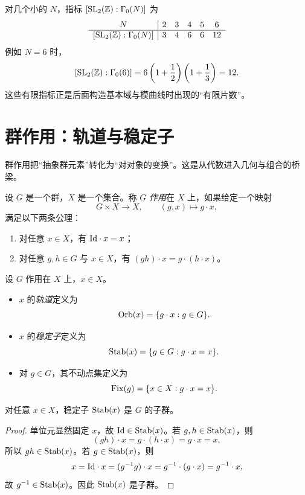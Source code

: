 \begin{example}
对几个小的 $N$，指标 $[\mathrm{SL}_2(\mathbb{Z}):\Gamma_0(N)]$ 为
\[
\begin{array}{c|ccccc}
N & 2 & 3 & 4 & 5 & 6 \\\hline
[\mathrm{SL}_2(\mathbb{Z}):\Gamma_0(N)] & 3 & 4 & 6 & 6 & 12
\end{array}
\]
例如 $N=6$ 时，
\[
[\mathrm{SL}_2(\mathbb{Z}):\Gamma_0(6)]
=6\left(1+\frac12\right)\left(1+\frac13\right)=12.
\]
这些有限指标正是后面构造基本域与模曲线时出现的“有限片数”。
\end{example}

\section{群作用：轨道与稳定子}

群作用把“抽象群元素”转化为“对对象的变换”。这是从代数进入几何与组合的桥梁。

\begin{definition}
设 $G$ 是一个群，$X$ 是一个集合。称 $G$ \emph{作用}在 $X$ 上，如果给定一个映射
\[
G\times X\longrightarrow X,
\qquad (g,x)\longmapsto g\cdot x,
\]
满足以下两条公理：
\begin{enumerate}
  \item 对任意 $x\in X$，有 $\mathrm{Id}\cdot x=x$；
  \item 对任意 $g,h\in G$ 与 $x\in X$，有 $(gh)\cdot x=g\cdot(h\cdot x)$。
\end{enumerate}
\end{definition}

\begin{definition}
设 $G$ 作用在 $X$ 上，$x\in X$。
\begin{itemize}
  \item $x$ 的\emph{轨道}定义为
  \[
  \operatorname{Orb}(x)=\{g\cdot x:g\in G\}.
  \]
  \item $x$ 的\emph{稳定子}定义为
  \[
  \operatorname{Stab}(x)=\{g\in G:g\cdot x=x\}.
  \]
  \item 对 $g\in G$，其不动点集定义为
  \[
  \operatorname{Fix}(g)=\{x\in X:g\cdot x=x\}.
  \]
\end{itemize}
\end{definition}

\begin{proposition}
对任意 $x\in X$，稳定子 $\operatorname{Stab}(x)$ 是 $G$ 的子群。
\end{proposition}

\begin{proof}
单位元显然固定 $x$，故 $\mathrm{Id}\in \operatorname{Stab}(x)$。若 $g,h\in \operatorname{Stab}(x)$，则
\[
(gh)\cdot x=g\cdot(h\cdot x)=g\cdot x=x,
\]
所以 $gh\in \operatorname{Stab}(x)$。若 $g\in \operatorname{Stab}(x)$，则
\[
x=\mathrm{Id}\cdot x=(g^{-1}g)\cdot x=g^{-1}\cdot(g\cdot x)=g^{-1}\cdot x,
\]
故 $g^{-1}\in \operatorname{Stab}(x)$。因此 $\operatorname{Stab}(x)$ 是子群。
\end{proof}

